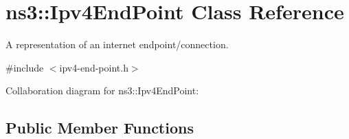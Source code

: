 \hypertarget{classns3_1_1Ipv4EndPoint}{}\section{ns3\+:\+:Ipv4\+End\+Point Class Reference}
\label{classns3_1_1Ipv4EndPoint}


A representation of an internet endpoint/connection.  




{\ttfamily \#include $<$ipv4-\/end-\/point.\+h$>$}



Collaboration diagram for ns3\+:\+:Ipv4\+End\+Point\+:
\subsection*{Public Member Functions}

